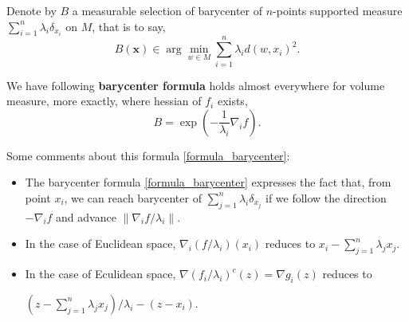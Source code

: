 Denote by $B$ a measurable selection of barycenter of
$n$-points supported measure $\sum_{i=1}^{n} \lambda_i \delta_{x_i}$ on $M$,
that is to say,
\[
	B(\boldsymbol{x}) \in \arg \min_{w \in M} \sum_{i=1}^{n} \lambda_i d(w, x_i)^2.
\]


We have following \textbf{barycenter formula} holds almost everywhere for volume measure,
more exactly, where hessian of $f_i$ exists,
\begin{equation}
	\label{formula_barycenter}
	B = \exp (- \frac{1}{\lambda_i} \nabla_i f).
\end{equation}



\begin{rmk}
	Some comments about this formula \cref{formula_barycenter}:
	\begin{itemize}
		\item The barycenter formula \cref{formula_barycenter} expresses the fact that,
		      from point $x_i$,
		      we can reach barycenter of $\sum_{j=1}^n \lambda_i \delta_{x_j}$ if we follow
		      the direction $-\nabla_i f$
		      and advance $\| \nabla_i f / \lambda_i \| $.
		\item In the case of Euclidean space, $\nabla_i (f/\lambda_i)(x_i)$ reduces to
		      $x_i - \sum_{j=1}^n \lambda_j x_j$.
		\item In the case of Eculidean space, $\nabla (f_i / \lambda_i)^c (z) = \nabla g_i(z) $ reduces to

		      $(z - \sum_{j=1}^n \lambda_j x_j) / \lambda_i -(z-x_i)$.
	\end{itemize}
\end{rmk}

